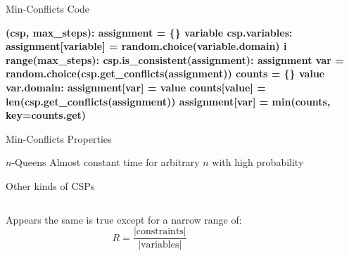 \documentclass[14pt]{beamer}
\begin{document}
\begin{frame}[fragile]{Min-Conflicts Code}
	\scriptsize
	\begin{semiverbatim}\bfseries
		 (csp, max_steps):
		    \pause{}
		    assignment = \{\}
		     variable  csp.variables:
		        assignment[variable] = random.choice(variable.domain)
		    \pause{}
		     i  range(max_steps):
		        \pause{}
		         csp.is_consistent(assignment):
		             assignment
		        \pause{}
		        var = random.choice(csp.get_conflicts(assignment))
		        \pause{}
		        counts = \{\}
		         value  var.domain:
		            assignment[var] = value
		            counts[value] = len(csp.get_conflicts(assignment))
		        assignment[var] = min(counts, key=counts.get)
		    \pause{}
		     
	\end{semiverbatim}
\end{frame}
\begin{frame}{Min-Conflicts Properties}
	\begin{block}{$n$-Queens}
		Almost constant time for arbitrary $n$ with high probability
	\end{block}
	\pause
	\begin{block}{Other kinds of CSPs}
		\begin{columns}
			\begin{column}{1.5in}
				Appears the same is true except for a narrow range of:
				\[
					R = \frac{\left|\mbox{constraints}\right|}{\left|\mbox{variables}\right|}
				\]
			\end{column}
			\begin{column}{2in}
				\begin{center}
				\end{center}
			\end{column}
		\end{columns}
	\end{block}
\end{frame}
\end{document}

